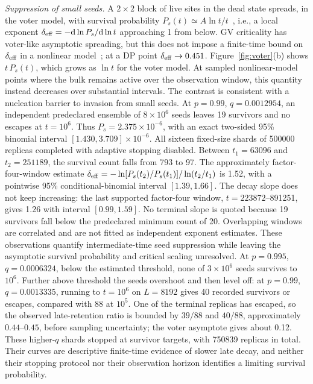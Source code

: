 \textit{Suppression of small seeds.} A $2\times2$ block of live sites in the dead state
spreads, in the voter model, with survival probability $P_s(t)\simeq A\ln t/t$~\cite{bramson1980},
i.e., a local exponent $\delta_{\rm eff} = -\mathrm{d}\ln P_s/\mathrm{d}\ln t$ approaching 1 from below. GV criticality has voter-like asymptotic spreading, but this does not impose a finite-time bound on $\delta_{\rm eff}$ in a nonlinear model~\cite{castellano2012,azizi2020}; at a DP point $\delta_{\rm eff}\to0.451$. Figure~\ref{fig:voter}(b)
shows $t\,P_s(t)$, which grows as $\ln t$ for the voter model. At sampled
nonlinear-model points where the bulk remains active over the observation
window, this quantity instead decreases over substantial intervals.
The contrast is consistent with a nucleation barrier to invasion from
small seeds. At $p=0.99$, $q=0.0012954$, an independent predeclared
ensemble of $8\times10^6$ seeds leaves 19 survivors and no escapes at
$t=10^6$. Thus $P_s=2.375\times10^{-6}$, with an exact two-sided 95\%
binomial interval $[1.430,3.709]\times10^{-6}$. All sixteen fixed-size
shards of 500000 replicas completed with adaptive stopping disabled.
Between $t_1=63096$ and $t_2=251189$, the survival count falls from
793 to 97. The approximately factor-four-window estimate
$\delta_{\rm eff}=-\ln[P_s(t_2)/P_s(t_1)]/\ln(t_2/t_1)$ is 1.52,
with a pointwise 95\% conditional-binomial interval $[1.39,1.66]$.
The decay slope does not keep increasing: the last supported factor-four
window, $t=223872$--891251, gives 1.26 with interval $[0.99,1.59]$.
No terminal slope is quoted because 19 survivors fall below the
predeclared minimum count of 20. Overlapping windows are correlated
and are not fitted as independent exponent estimates. These observations
quantify intermediate-time seed suppression while leaving the asymptotic
survival probability and critical scaling unresolved.
At $p=0.995$, $q=0.0006324$, below the estimated threshold, none of
$3\times10^6$ seeds survives to $10^6$. Further above threshold the seeds
overshoot and then level off: at $p=0.99$, $q=0.0013335$, running to
$t=10^6$ on $L=8192$ gives 40 recorded survivors or escapes, compared with
88 at $10^5$. One of the terminal replicas has escaped, so the observed
late-retention ratio is bounded by $39/88$ and $40/88$, approximately
$0.44$--$0.45$, before sampling uncertainty; the voter asymptote gives
about 0.12. These higher-$q$ shards stopped at survivor targets, with
750839 replicas in total. Their curves are descriptive finite-time
evidence of slower late decay, and neither their stopping protocol nor
their observation horizon identifies a limiting survival probability.

